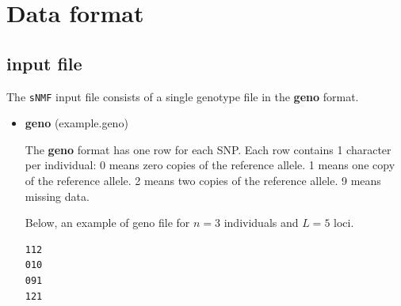 \documentclass[10pt,a4paper]{article}
\begin{document}
\section{Data format}

\subsection{input file}
The {\tt sNMF} input file consists of a single genotype file in the {\bf geno} format. 
\begin{itemize}
\item {\bf geno} (example.geno)

The {\bf geno} format has one row for each SNP.
  Each row contains 1 character per individual:
  0 means zero copies of the reference allele.
  1 means one copy of the reference allele.
  2 means two copies of the reference allele.
  9 means missing data.

Below, an example of geno file for $n=3$ individuals and $L=5$ loci.
\begin{center}
\footnotesize
\begin{Verbatim}[frame=single]
112
010
091
121
\end{Verbatim}
\end{center}
\end{itemize}
\end{document}
